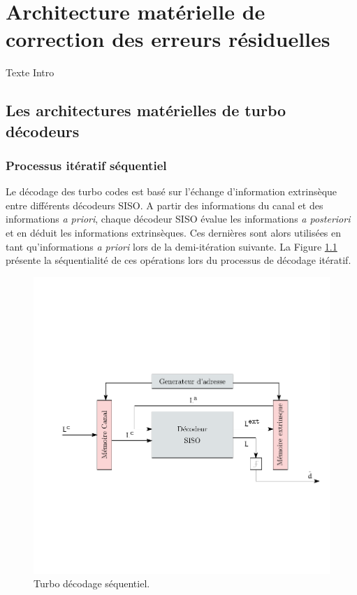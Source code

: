 \chapter{Architecture matérielle de correction des erreurs résiduelles}

Texte Intro


\vspace*{\fill}
\minitocTITI
\vspace*{\fill}
\newpage

\section{Les architectures matérielles de turbo décodeurs}

\subsection{Processus itératif séquentiel}

Le décodage des turbo codes est basé sur l'échange d'information extrinsèque entre différents décodeurs SISO. A partir 
des informations du canal et des informations \textit{a priori}, chaque décodeur SISO évalue les informations 
\textit{a posteriori} et en déduit les informations extrinsèques. Ces dernières sont alors utilisées en tant 
qu'informations \textit{a priori} lors de la demi-itération suivante. La Figure \ref{fig:turbo_seq} présente la 
séquentialité de ces opérations lors du processus de décodage itératif.

\begin{figure}[!h]
	\centering
	\includegraphics{main/ch4_fig/ipe/serial.pdf}
	\caption{Turbo décodage séquentiel. \label{fig:turbo_seq}}
\end{figure} 
 
